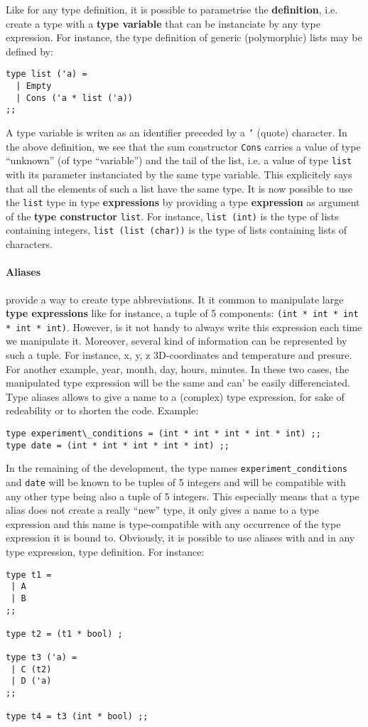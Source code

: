 Like for any type definition, it is possible to parametrise the
{\bf definition}, i.e. create a type with a {\bf type variable} that
can be instanciate by any type expression. For instance, the type
definition of generic (polymorphic) lists may be defined by:
{\scriptsize
\begin{lstlisting}
type list ('a) =
  | Empty
  | Cons ('a * list ('a))
;;
\end{lstlisting}
}
A type variable is writen as an identifier preceded by a {\tt '}
(quote) character. In the above definition, we see that the sum
constructor {\tt Cons} carries a value of type ``unknown'' (of type
``variable'') and the tail of the list, i.e. a value of type
{\tt list} with its parameter instanciated by the same type
variable. This explicitely says that all the elements of such a list
have the same type. It is now possible to use the {\tt list} type in
type {\bf expressions} by providing a type {\bf expression} as
argument of the {\bf type constructor} {\tt list}. For instance,
{\tt list (int)} is the type of lists containing integers,
{\tt list (list (char))} is the type of lists containing lists of
characters.



\paragraph{Aliases} provide a way to create type abbreviations. It it
common to manipulate large {\bf type expressions} like for instance, a
tuple of 5 components: {\tt (int * int * int * int * int)}. However,
is it not handy to always write this expression each time we
manipulate it. Moreover, several kind of information can be
represented by such a tuple. For instance, x, y, z 3D-coordinates and
temperature and presure. For another example, year, month, day, hours,
minutes. In these two cases, the manipulated type expression will be
the same and can' be easily differenciated. Type aliases allows to
give a name to a (complex) type expression, for sake of redeability or
to shorten the code. Example:
{\scriptsize
\begin{lstlisting}
type experiment\_conditions = (int * int * int * int * int) ;;
type date = (int * int * int * int * int) ;;
\end{lstlisting}
}
In the remaining of the development, the type names
{\tt  experiment\_conditions} and {\tt date} will be known to be
tuples of 5 integers and will be compatible with any other type being
also a tuple of 5 integers. This especially means that a type alias
does not create a really ``new'' type, it only gives a name to a type
expression and this name is type-compatible with any occurrence of the
type expression it is bound to. Obviously, it is possible to use
aliases with and in any type expression, type definition. For
instance:
{\scriptsize
\begin{lstlisting}
type t1 =
 | A
 | B
;;

type t2 = (t1 * bool) ;

type t3 ('a) =
 | C (t2)
 | D ('a)
;;

type t4 = t3 (int * bool) ;;
\end{lstlisting}
}



